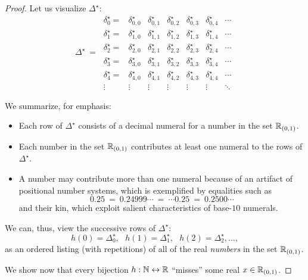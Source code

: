 \begin{proof}
\bigskip

\noindent Let us visualize $\Delta^\star$:
\[ \Delta^\star \ = \
\begin{array}{ccccccc}
\delta^\star_0 = &
\delta^\star_{0,0} & \delta^\star_{0,1} & \delta^\star_{0,2} & \delta^\star_{0,3} &
	\delta^\star_{0,4} & \cdots \\
\delta^\star_1 = &
\delta^\star_{1,0} & \delta^\star_{1,1} & \delta^\star_{1,2} & \delta^\star_{1,3} &
	\delta^\star_{1,4} & \cdots \\
\delta^\star_2 = &
\delta^\star_{2,0} & \delta^\star_{2,1} & \delta^\star_{2,2} & \delta^\star_{2,3} &
	\delta^\star_{2,4} & \cdots \\
\delta^\star_3 = &
\delta^\star_{3,0} & \delta^\star_{3,1} & \delta^\star_{3,2} & \delta^\star_{3,3} &
	\delta^\star_{3,4} & \cdots \\ 
\delta^\star_4 = &
\delta^\star_{4,0} & \delta^\star_{4,1} & \delta^\star_{4,2} & \delta^\star_{4,3} &
	\delta^\star_{4,4} & \cdots \\ 
\vdots &
\vdots  & \vdots  & \vdots  & \vdots  & \vdots  & \ddots
\end{array}
\]

\noindent We summarize, for emphasis:
\begin{itemize}
\item
Each row of $\Delta^\star$ consists of a decimal numeral for a number in the set $\mathbb{R}_{(0,1)}$.

\medskip\item
Each number in the set $\mathbb{R}_{(0,1)}$ contributes at least one numeral to the rows of $\Delta^\star$.

\medskip\item
A number may contribute more than one numeral because of an artifact of positional number systems, which is exemplified by equalities such as
\[
0.25 \ = \ 0.24999\cdots \ = \  \cdots 0.25 \ = \ 0.2500 \cdots
\]
and their kin, which exploit salient characteristics of base-$10$ numerals.
\end{itemize}
We can, thus, view the successive rows of $\Delta^\star$: 
\[ h(0) = \Delta^\star_0, \ \ \ h(1) = \Delta^\star_1,  \ \ \ h(2) = \Delta^\star_2, \ldots, \]
as an ordered listing (with repetitions) of all of the real {\em numbers} in the set $\mathbb{R}_{(0,1)}$.

\medskip

We show now that every bijection $h: \mathbb{N} \leftrightarrow \mathbb{R}$ ``misses'' some real $x \in \mathbb{R}_{(0,1)}$.

\smallskip


\end{proof}
